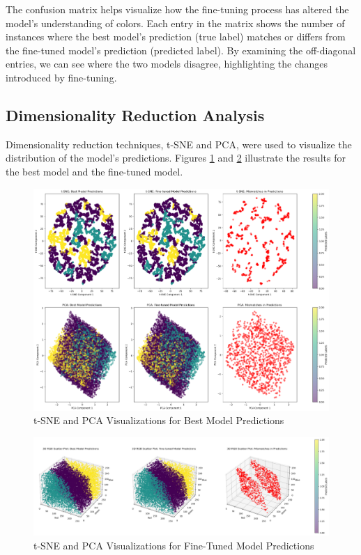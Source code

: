\documentclass{article}
\begin{document}
The confusion matrix helps visualize how the fine-tuning process has altered the model's understanding of colors. Each entry in the matrix shows the number of instances where the best model's prediction (true label) matches or differs from the fine-tuned model's prediction (predicted label). By examining the off-diagonal entries, we can see where the two models disagree, highlighting the changes introduced by fine-tuning.

\subsection{Dimensionality Reduction Analysis}
Dimensionality reduction techniques, t-SNE and PCA, were used to visualize the distribution of the model's predictions. Figures \ref{fig:tsne_pca_best} and \ref{fig:tsne_pca_fine_tuned} illustrate the results for the best model and the fine-tuned model.

\begin{figure}[H]
    \centering
    \includegraphics[width=\textwidth]{pictures/graph_2_comp.png}
    \caption{t-SNE and PCA Visualizations for Best Model Predictions}
    \label{fig:tsne_pca_best}
\end{figure}

\begin{figure}[H]
    \centering
    \includegraphics[width=\textwidth]{pictures/graph_3_comp.png}
    \caption{t-SNE and PCA Visualizations for Fine-Tuned Model Predictions}
    \label{fig:tsne_pca_fine_tuned}
\end{figure}
\end{document}
